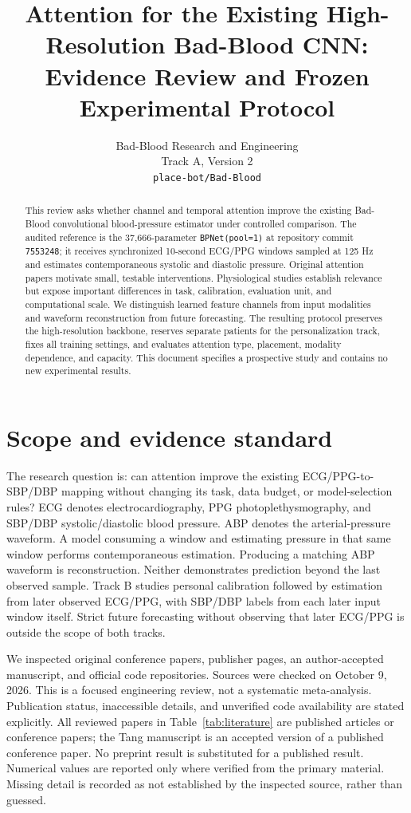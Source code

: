 \documentclass[11pt]{article}
\title{Attention for the Existing High-Resolution Bad-Blood CNN:\\Evidence Review and Frozen Experimental Protocol}
\author{Bad-Blood Research and Engineering\\Track A, Version 2\\\texttt{place-bot/Bad-Blood}}
\date{}
\begin{document}
\maketitle
\begin{abstract}
This review asks whether channel and temporal attention improve the existing Bad-Blood convolutional blood-pressure estimator under controlled comparison. The audited reference is the 37,666-parameter \texttt{BPNet(pool=1)} at repository commit \texttt{7553248}; it receives synchronized 10-second ECG/PPG windows sampled at 125 Hz and estimates contemporaneous systolic and diastolic pressure. Original attention papers motivate small, testable interventions. Physiological studies establish relevance but expose important differences in task, calibration, evaluation unit, and computational scale. We distinguish learned feature channels from input modalities and waveform reconstruction from future forecasting. The resulting protocol preserves the high-resolution backbone, reserves separate patients for the personalization track, fixes all training settings, and evaluates attention type, placement, modality dependence, and capacity. This document specifies a prospective study and contains no new experimental results.
\end{abstract}

\section{Scope and evidence standard}
The research question is: can attention improve the existing ECG/PPG-to-SBP/DBP mapping without changing its task, data budget, or model-selection rules? ECG denotes electrocardiography, PPG photoplethysmography, and SBP/DBP systolic/diastolic blood pressure. ABP denotes the arterial-pressure waveform. A model consuming a window and estimating pressure in that same window performs contemporaneous estimation. Producing a matching ABP waveform is reconstruction. Neither demonstrates prediction beyond the last observed sample. Track B studies personal calibration followed by estimation from later observed ECG/PPG, with SBP/DBP labels from each later input window itself. Strict future forecasting without observing that later ECG/PPG is outside the scope of both tracks.

We inspected original conference papers, publisher pages, an author-accepted manuscript, and official code repositories. Sources were checked on October 9, 2026. This is a focused engineering review, not a systematic meta-analysis. Publication status, inaccessible details, and unverified code availability are stated explicitly. All reviewed papers in Table~\ref{tab:literature} are published articles or conference papers; the Tang manuscript is an accepted version of a published conference paper. No preprint result is substituted for a published result. Numerical values are reported only where verified from the primary material. Missing detail is recorded as not established by the inspected source, rather than guessed.
\end{document}
